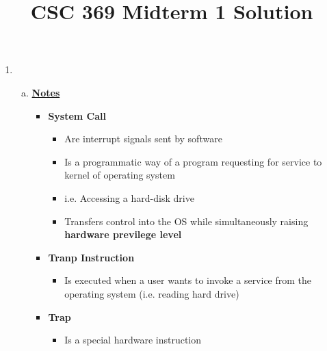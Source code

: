 \documentclass[12pt]{article}
\begin{document}
\title{CSC 369 Midterm 1 Solution}

\bigskip

\begin{enumerate}[1.]
    \item

    \begin{enumerate}[a)]
        \item
        \bigskip

        \underline{\textbf{Notes}}

        \begin{itemize}
            \item \textbf{System Call}
            \begin{itemize}
                \item Are interrupt signals sent by software
                \item Is a programmatic way of a program requesting for service to kernel of operating system
                \item i.e. Accessing a hard-disk drive
                \item Transfers control into the OS while simultaneously raising \textbf{hardware previlege level}
            \end{itemize}

            \item \textbf{Tranp Instruction}

            \begin{itemize}
                \item Is executed when a user wants to invoke a service from the operating system (i.e. reading hard drive)
            \end{itemize}

            \item \textbf{Trap}

            \begin{itemize}
                \item Is a special hardware instruction
            \end{itemize}
        \end{itemize}
    \end{enumerate}
\end{enumerate}
\end{document}
